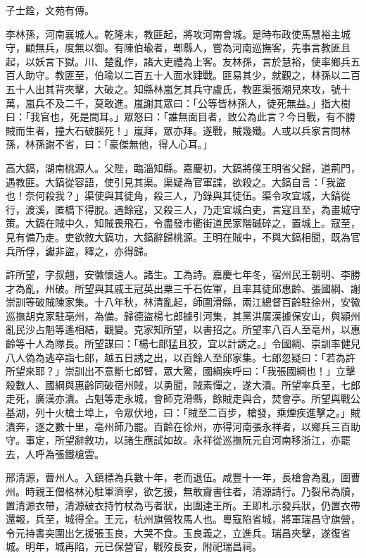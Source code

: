 \begin{pinyinscope}
子士銓，文苑有傳。

李林孫，河南襄城人。乾隆末，教匪起，將攻河南會城。是時布政使馬慧裕主城守，顧無兵，度無以御。有陳伯瑜者，郫縣人，嘗為河南巡撫客，先事言教匪且起，以妖言下獄。川、楚亂作，諸大吏禮為上客。友林孫，言於慧裕，使率鄉兵五百人助守。教匪至，伯瑜以二百五十人面水肄戰。匪易其少，就觀之，林孫以二百五十人出其背夾擊，大破之。知縣林嵐乞其兵守盧氏，教匪渠張潮兒來攻，號十萬，嵐兵不及二千，莫敢進。嵐謝其眾曰：「公等皆林孫人，徒死無益。」指大樹曰：「我官也，死是間耳。」眾怒曰：「誰無面目者，致公為此言？今日戰，有不勝賊而生者，撞大石破腦死！」嵐拜，眾亦拜。遂戰，賊幾殲。人或以兵家言問林孫，林孫謝不省，曰：「豪傑無他，得人心耳。」

高大鎬，湖南桃源人。父陛，臨淄知縣。嘉慶初，大鎬將僕王明省父歸，道荊門，遇教匪。大鎬從容語，使引見其渠。渠疑為官軍諜，欲殺之。大鎬自言：「我盜也！奈何殺我？」渠使與其徒角，殺三人，乃錄與其徒伍。渠令攻宜城，大鎬從行，渡溪，匿橋下得脫。遇餘寇，又殺三人，乃走宜城白吏，言寇且至，為畫城守策。大鎬在賊中久，知賊畏飛石，令盡發市衢街道民家階磩碎之，置城上。寇至，見有備乃走。吏欲敘大鎬功，大鎬辭歸桃源。王明在賊中，不與大鎬相聞，既為官兵所俘，讞非盜，釋之，亦得歸。

許所望，字叔翹，安徽懷遠人。諸生。工為詩。嘉慶七年冬，宿州民王朝明、李勝才為亂，州破。所望與其戚王冠英出粟三千石佐軍，且率其徒邱惠齡、張國綱、謝崇訓等破賊陳家集。十八年秋，林清亂起，師圍滑縣，兩江總督百齡駐徐州，安徽巡撫胡克家駐亳州，為備。歸德盜楊七郎據引河集，其黨洪廣漢據保安山，與潁州亂民沙占魁等遙相結，觀變。克家知所望，以書招之。所望率八百人至亳州，以惠齡等十人為隊長。所望謀曰：「楊七郎猛且狡，宜以計誘之。」令國綱、崇訓率健兒八人偽為逃卒詣七郎，越五日誘之出，以百餘人至邱家集。七郎忽疑曰：「若為許所望來耶？」崇訓出不意斷七郎臂，眾大驚，國綱疾呼曰：「我張國綱也！」立擊殺數人、國綱與惠齡同破宿州賊，以勇聞，賊素憚之，遂大潰。所望率兵至，七郎走死，廣漢亦潰。占魁等走永城，會師克滑縣，餘賊走與合，焚會亭。所望與戰公基湖，列十火槍土埠上，令眾伏地，曰：「賊至二百步，槍發，乘煙疾進擊之。」賊潰奔，逐之數十里，亳州師乃罷。百齡在徐州，亦得河南張永祥者，以鄉兵三百助守。事定，所望辭敘功，以諸生應試如故。永祥從巡撫阮元自河南移浙江，亦罷去，人呼為張鐵槍雲。

邢清源，曹州人。入鎮標為兵數十年，老而退伍。咸豐十一年，長槍會為亂，圍曹州。時親王僧格林沁駐軍濟寧，欲乞援，無敢齎書往者，清源請行。乃裂帛為牘，置清源衣帶，清源破衣持竹杖為丐者狀，出圍達王所。王即札示發兵狀，仍置衣帶還報，兵至，城得全。王元，杭州旗營牧馬人也。粵寇陷省城，將軍瑞昌守旗營，令元持書突圍出乞援張玉良，大哭不食。玉良義之，立進兵。瑞昌夾擊，遂復省城。明年，城再陷，元已保營官，戰歿長安，附祀瑞昌祠。


\end{pinyinscope}
